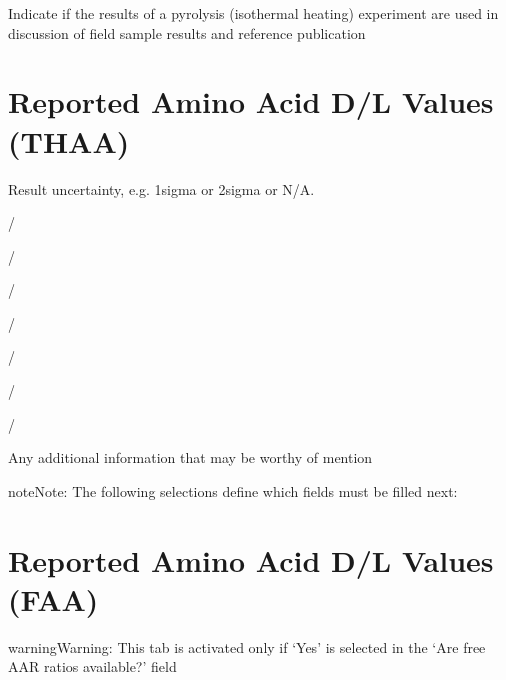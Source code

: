 \documentclass[letterpaper,10pt,english]{sphinxmanual}
\begin{document}
 \sphinxhyphen{} Indicate if the results of a pyrolysis (isothermal heating) experiment are used in discussion of field sample results and reference publication


\section{Reported Amino Acid D/L Values (THAA)}
\label{\detokenize{AAR:reported-amino-acid-d-l-values-thaa}}
 \sphinxhyphen{} Result uncertainty, e.g. 1\sphinxhyphen{}sigma or 2\sphinxhyphen{}sigma or N/A.


 / 

 / 

 / 

 / 

 / 

 / 

 / 

 \sphinxhyphen{} Any additional information that may be worthy of mention

\begin{sphinxadmonition}{note}{Note:}
The following selections define which fields must be filled next:



\end{sphinxadmonition}


\section{Reported Amino Acid D/L Values (FAA)}
\label{\detokenize{AAR:reported-amino-acid-d-l-values-faa}}
\begin{sphinxadmonition}{warning}{Warning:}
This tab is activated only if ‘Yes’ is selected in the ‘Are free AAR ratios available?’ field
\end{sphinxadmonition}
\end{document}
